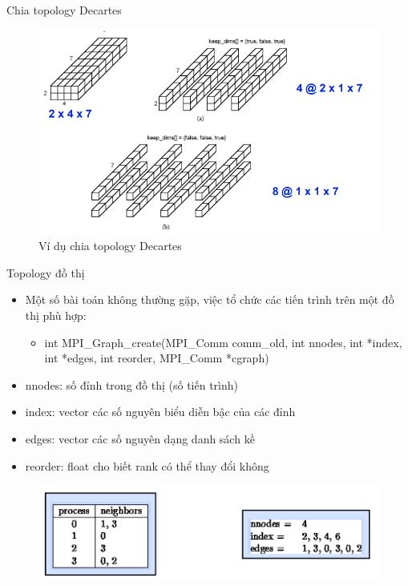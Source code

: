 \documentclass[10pt]{beamer}
\theoremstyle{remark}
\numberwithin{algocf}{section}
\numberwithin{equation}{section}
\numberwithin{dl}{section}
\numberwithin{figure}{section}
\begin{document}
\begin{frame}{Chia topology Decartes}
    \begin{figure}[H]
        \centering
        \includegraphics[height=0.6\textheight]{figures/MPI/Cartesion_sub.png}
        \caption{Ví dụ chia topology Decartes}
    \end{figure}
\end{frame}

\begin{frame}[shrink]{Topology đồ thị}
    \begin{itemize}
        \item Một số bài toán không thường gặp, việc tổ chức các tiến trình trên một đồ thị phù hợp:
        \begin{itemize}
            \item int MPI\_Graph\_create(MPI\_Comm comm\_old, int nnodes,
                                         int *index, int *edges,
                                         int reorder, MPI\_Comm *cgraph)           
        \end{itemize}
        \item nnodes: số đỉnh trong đồ thị (số tiến trình)
        \item index: vector các số nguyên biểu diễn bậc của các đỉnh
        \item edges: vector các số nguyên dạng danh sách kề
        \item reorder: float cho biết rank có thể thay đổi không
    \end{itemize}

    \begin{figure}[H]
        \centering
        \includegraphics[height=0.3\textheight]{figures/MPI/Graph_Example.png}
    \end{figure}
\end{frame}
\end{document}
